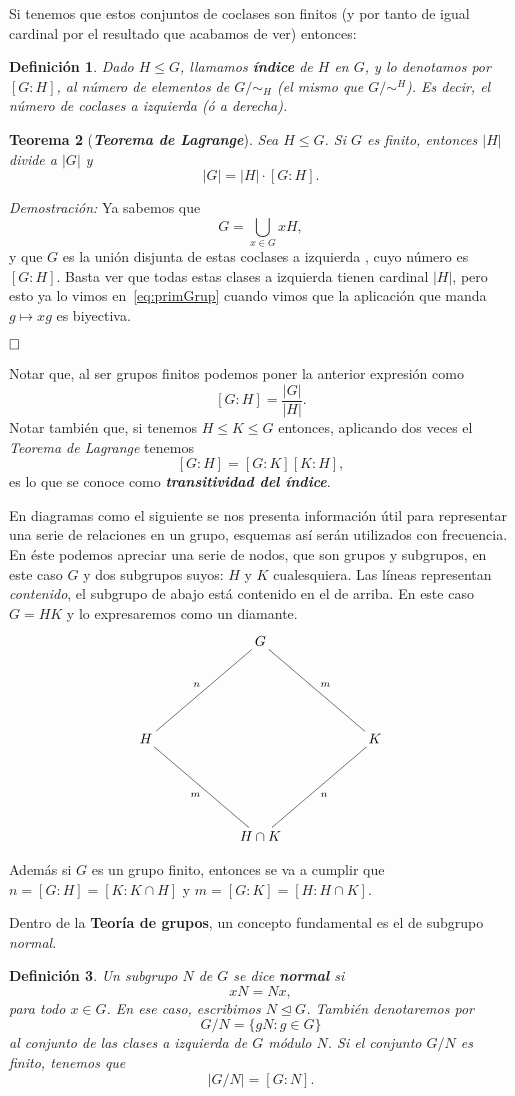 \documentclass[12pt]{article}
\newtheorem{theorem}{Teorema}[section]
\newtheorem{definition}[theorem]{Definición}
\begin{document}
Si tenemos que estos conjuntos de coclases son finitos (y por tanto de igual cardinal por el resultado que acabamos de ver) entonces:

\begin{definition}Dado $H \leq G$, llamamos \textbf{índice} de $H$ en $G$, y lo denotamos por $[G:H]$, al número de elementos de $G/\sim_{H}$ (el mismo que $G/\sim^{H}$). Es decir, el número de coclases a izquierda (ó a derecha).
\end{definition}

\begin{theorem}[\textbf{\textit{Teorema de Lagrange}}]
Sea $H \leq G$. Si $G$ es finito, entonces $|H|$ divide a $|G|$ y $$|G| = |H|\cdot \left[ G:H \right].$$
\end{theorem}
\emph{Demostración: }Ya sabemos que $$G = \bigcup_{x\in G} xH,$$ y que $G$ es la unión disjunta de estas coclases a izquierda , cuyo número es $[G:H]$. Basta ver que todas estas clases a izquierda tienen cardinal $|H|$, pero esto ya lo vimos en~\ref{eq:primGrup} cuando vimos que la aplicación que manda $g \longmapsto xg$ es biyectiva.

$\hfill \square$

Notar que, al ser grupos finitos podemos poner la anterior expresión como $$[G:H] = \dfrac{|G|}{|H|}.$$
Notar también que, si tenemos $H \leq K \leq G$ entonces, aplicando dos veces el \textit{Teorema de Lagrange} tenemos $$[G:H]=[G:K][K:H],$$ es lo que se conoce como \textbf{\textit{transitividad del índice}}.

En diagramas como el siguiente se nos presenta información útil para representar una serie de relaciones en un grupo, esquemas así serán utilizados con frecuencia. En éste podemos apreciar una serie de nodos, que son grupos y subgrupos, en este caso $G$ y dos subgrupos suyos: $H$ y $K$ cualesquiera. Las líneas representan \textit{contenido}, el subgrupo de abajo está contenido en el de arriba. En este caso $G=HK$ y lo expresaremos como un diamante. 
$$\xymatrix @=2cm {&G \ar@{-}[ld]_n \ar@{-}[rd]^m  \\ H \ar@{-}[rd]_m & & K \ar@{-}[ld]^n \\ &H \cap K }$$

Además si $G$ es un grupo finito, entonces se va a cumplir que $n= [G:H] = [K: K \cap H]$ y $m= [G:K] = [H : H \cap K]$.

Dentro de la \textbf{Teoría de grupos}, un concepto fundamental es el de subgrupo \textit{normal}.

\begin{definition} Un subgrupo $N$ de $G$ se dice \textbf{normal} si $$xN = Nx,$$ para todo $x \in G$. En ese caso, escribimos $N \unlhd G$. También denotaremos por $$G/N = \lbrace gN : g\in G\rbrace$$ al conjunto de las clases a izquierda de $G$ módulo $N$. Si el conjunto $G/N$ es finito, tenemos que $$|G/N| = [G:N].$$
\end{definition}
\end{document}
